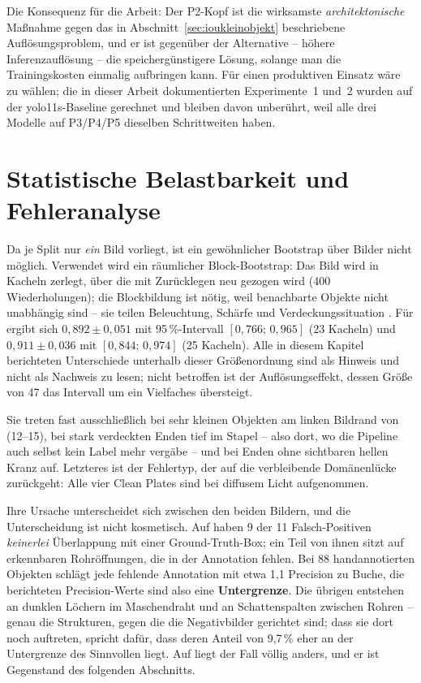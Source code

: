 Die Konsequenz für die Arbeit: Der P2-Kopf ist die wirksamste
\emph{architektonische} Maßnahme gegen das in
Abschnitt~\ref{sec:ioukleinobjekt} beschriebene Auflösungsproblem, und er ist
gegenüber der Alternative -- höhere Inferenzauflösung -- die
speichergünstigere Lösung, solange man die Trainingskosten einmalig aufbringen
kann. Für einen produktiven Einsatz wäre  zu wählen; die in
dieser Arbeit dokumentierten Experimente~1 und~2 wurden auf der yolo11s-Baseline
gerechnet und bleiben davon unberührt, weil alle drei Modelle auf P3/P4/P5
dieselben Schrittweiten haben.

\section{Statistische Belastbarkeit und Fehleranalyse}
\label{sec:bootstrap}

Da je Split nur \emph{ein} Bild vorliegt, ist ein gewöhnlicher Bootstrap über
Bilder nicht möglich. Verwendet wird ein räumlicher Block-Bootstrap: Das Bild wird
in Kacheln zerlegt, über die mit Zurücklegen neu gezogen wird (400
Wiederholungen); die Blockbildung ist nötig, weil benachbarte Objekte nicht
unabhängig sind -- sie teilen Beleuchtung, Schärfe und Verdeckungssituation
\parencite{kuensch1989,efron1993}. Für \mAPfifty{} ergibt sich 
$0{,}892 \pm 0{,}051$ mit 95\,\%-Intervall $[0{,}766;\,0{,}965]$ (23 Kacheln) und
 $0{,}911 \pm 0{,}036$ mit $[0{,}844;\,0{,}974]$ (25 Kacheln). Alle in
diesem Kapitel berichteten Unterschiede unterhalb dieser Größenordnung sind als
Hinweis und nicht als Nachweis zu lesen; nicht betroffen ist der
Auflösungseffekt, dessen Größe von 47\PP{} das Intervall um ein Vielfaches
übersteigt.

 Sie treten fast ausschließlich bei sehr kleinen
Objekten am linken Bildrand von  (12--15\px), bei stark verdeckten
Enden tief im Stapel -- also dort, wo die Pipeline auch selbst kein Label mehr
vergäbe -- und bei Enden ohne sichtbaren hellen Kranz auf. Letzteres ist der
Fehlertyp, der auf die verbleibende Domänenlücke zurückgeht: Alle vier Clean
Plates sind bei diffusem Licht aufgenommen.

 Ihre Ursache unterscheidet sich zwischen den beiden
Bildern, und die Unterscheidung ist nicht kosmetisch. Auf  haben 9 der
11 Falsch-Positiven \emph{keinerlei} Überlappung mit einer Ground-Truth-Box; ein
Teil von ihnen sitzt auf erkennbaren Rohröffnungen, die in der Annotation fehlen.
Bei 88 handannotierten Objekten schlägt jede fehlende Annotation mit etwa
1,1\PP{} Precision zu Buche, die berichteten Precision-Werte sind also eine
\textbf{Untergrenze}. Die übrigen entstehen an dunklen Löchern im Maschendraht
und an Schattenspalten zwischen Rohren -- genau die Strukturen, gegen die die
Negativbilder gerichtet sind; dass sie dort noch auftreten, spricht dafür, dass
deren Anteil von 9,7\,\% eher an der Untergrenze des Sinnvollen liegt. Auf
 liegt der Fall völlig anders, und er ist Gegenstand des folgenden
Abschnitts.


